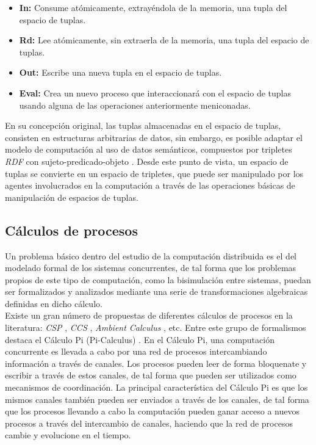 \begin{itemize}

\item \textbf{In:} Consume at\'omicamente, extray\'endola de la memoria, una tupla del espacio de tuplas.
\item \textbf{Rd:} Lee at\'omicamente, sin extraerla de la memoria, una tupla del espacio de tuplas.
\item \textbf{Out:} Escribe una nueva tupla en el espacio de tuplas.
\item \textbf{Eval:} Crea un nuevo proceso que interaccionar\'a con el espacio de tuplas usando alguna de las operaciones anteriormente meniconadas.

\end{itemize}

En su concepci\'on original, las tuplas almacenadas en el espacio de tuplas, consisten en estructuras arbitrarias de datos, sin embargo, es posible adaptar el modelo de computaci\'on al uso de datos sem\'anticos, compuestos por tripletes \textit{RDF} con sujeto-predicado-objeto \cite{fensel2004triple}. Desde este punto de vista, un espacio de tuplas se convierte en un espacio de tripletes, que puede ser manipulado por los agentes involucrados en la computaci\'on a trav\'es de las operaciones b\'asicas de manipulaci\'on de espacios de tuplas.

\subsection{C\'alculos de procesos}

Un problema b\'asico dentro del estudio de la computaci\'on distribuida es el del modelado formal de los sistemas concurrentes, de tal forma que los problemas propios de este tipo de computaci\'on, como la bisimulaci\'on entre sistemas,  puedan ser formalizados y analizados mediante una serie de transformaciones algebraicas definidas en dicho c\'alculo.\\
Existe un gran n\'umero de propuestas de diferentes c\'alculos de procesos en la literatura: \textit{CSP} \cite{csp}, \textit{CCS} \cite{ccs}, \textit{Ambient Calculus} \cite{ambient_calculus}, etc. Entre este grupo de formalismos destaca el C\'alculo Pi (Pi-Calculus) \cite{pi_calculus}. En el C\'alculo Pi, una computaci\'on concurrente es llevada a cabo por una red de procesos intercambiando informaci\'on a trav\'es de canales. Los procesos pueden leer de forma bloquenate y escribir a trav\'es de estos canales, de tal forma que pueden ser utilizados como mecanismos de coordinaci\'on. La principal caracter\'istica del C\'alculo Pi es que los mismos canales tambi\'en pueden ser enviados a trav\'es de los canales, de tal forma que los procesos llevando a cabo la computaci\'on pueden ganar acceso a nuevos procesos a trav\'es del intercambio de canales, haciendo que la red de procesos cambie y evolucione en el tiempo.\\

